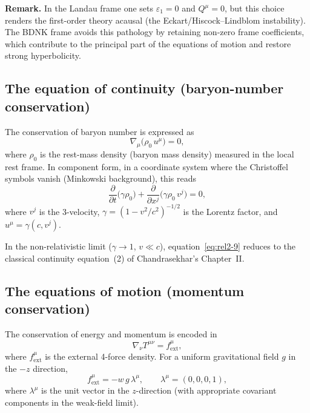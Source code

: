 \medskip
\noindent\textbf{Remark.}\quad
In the Landau frame one sets $\varepsilon_1 = 0$ and $Q^\mu = 0$, but
this choice renders the first-order theory acausal (the Eckart/Hiscock--Lindblom
instability).  The BDNK frame avoids this pathology by retaining
non-zero frame coefficients, which contribute to the principal part of the
equations of motion and restore strong hyperbolicity.

\subsection{The equation of continuity (baryon-number conservation)}%
\label{sec:rel7b}

The conservation of baryon number is expressed as
\begin{equation}
\label{eq:rel2-8}
  \nabla_\mu\!\bigl(\rho_0\, u^\mu\bigr) = 0,
\end{equation}
where $\rho_0$ is the rest-mass density (baryon mass density) measured in the
local rest frame.  In component form, in a coordinate system where the
Christoffel symbols vanish (Minkowski background), this reads
\begin{equation}
\label{eq:rel2-9}
  \frac{\partial}{\partial t}\bigl(\gamma\rho_0\bigr)
  + \frac{\partial}{\partial x^j}\bigl(\gamma\rho_0\, v^j\bigr) = 0,
\end{equation}
where $v^j$ is the 3-velocity, $\gamma = (1 - v^2/c^2)^{-1/2}$ is the
Lorentz factor, and $u^\mu = \gamma(c, v^j)$.

In the non-relativistic limit ($\gamma \to 1$, $v \ll c$), equation~\eqref{eq:rel2-9}
reduces to the classical continuity equation~(2) of Chandrasekhar's
Chapter~II.

\subsection{The equations of motion (momentum conservation)}%
\label{sec:rel7c}

The conservation of energy and momentum is encoded in
\begin{equation}
\label{eq:rel2-10}
  \nabla_\nu T^{\mu\nu} = f^\mu_{\mathrm{ext}},
\end{equation}
where $f^\mu_{\mathrm{ext}}$ is the external 4-force density.  For a uniform
gravitational field $g$ in the $-z$ direction,
\begin{equation}
\label{eq:rel2-11}
  f^\mu_{\mathrm{ext}} = -w\,g\,\lambda^\mu, \qquad
  \lambda^\mu = (0,0,0,1),
\end{equation}
where $\lambda^\mu$ is the unit vector in the $z$-direction (with appropriate
covariant components in the weak-field limit).


